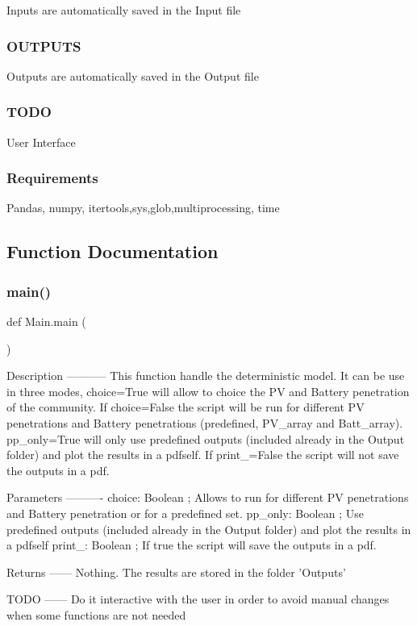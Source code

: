Inputs are automatically saved in the \textquotesingle{}Input\textquotesingle{} file \subsubsection*{O\+U\+T\+P\+U\+TS }

Outputs are automatically saved in the \textquotesingle{}Output\textquotesingle{} file \subsubsection*{T\+O\+DO }

User Interface \subsubsection*{Requirements }

Pandas, numpy, itertools,sys,glob,multiprocessing, time 

\subsection{Function Documentation}
\mbox{\label{namespace_main_ad808d947fc74de474e04b89fd9431ec8}} 
\subsubsection{\texorpdfstring{main()}{main()}}
{\footnotesize\ttfamily def Main.\+main (\begin{DoxyParamCaption}{ }\end{DoxyParamCaption})}

\begin{DoxyVerb}Description
-----------
This function handle the deterministic model. It can be use in three modes, choice=True will allow to choice the PV and Battery penetration of the community. If choice=False the script will be run for different PV penetrations and Battery penetrations (predefined, PV_array and Batt_array). pp_only=True will only use predefined outputs (included already in the Output folder) and plot the results in a pdfself. If print_=False the script will not save the outputs in a pdf.

Parameters
----------
choice: Boolean ; Allows to run for different PV penetrations and Battery penetration or for a predefined set.
pp_only: Boolean ; Use predefined outputs (included already in the Output folder) and plot the results in a pdfself
print_: Boolean ; If true the script will save the outputs in a pdf.

Returns
------
Nothing. The results are stored in the folder 'Outputs'

TODO
------
Do it interactive with the user in order to avoid manual changes when some functions are not needed
\end{DoxyVerb}
 \mbox{\label{namespace_main_abdb739977f22445f24edb008e9598bac}} 
